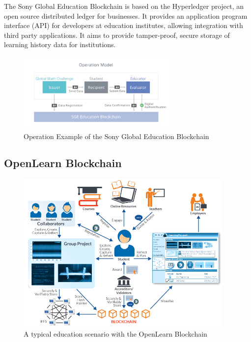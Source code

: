 The Sony Global Education Blockchain is based on the Hyperledger project, an open source distributed ledger 
for businesses. It provides an application program interface (API) for developers at education institutes, 
allowing integration with third party applications. It aims to provide tamper-proof, secure storage of 
learning history data for institutions. \citep{sonyged2017}

\begin{figure}[!ht] 
    \centering    
    \includegraphics[width=0.7\textwidth]{sonyged}
    \caption[Sony Global Education Blockchain]
        {Operation Example of the Sony Global Education Blockchain \citep{sonyged2017}}
    \label{fig:sonyged}
\end{figure}

\subsection{OpenLearn Blockchain}%

\begin{figure}[!ht] 
    \centering    
    \includegraphics[width=0.95\textwidth]{openlearn}
    \caption[OpenLearn Blockchain scenario]
        {A typical education scenario with the OpenLearn Blockchain \citep{openlearn2018}}
    \label{fig:openlearn}
\end{figure}

